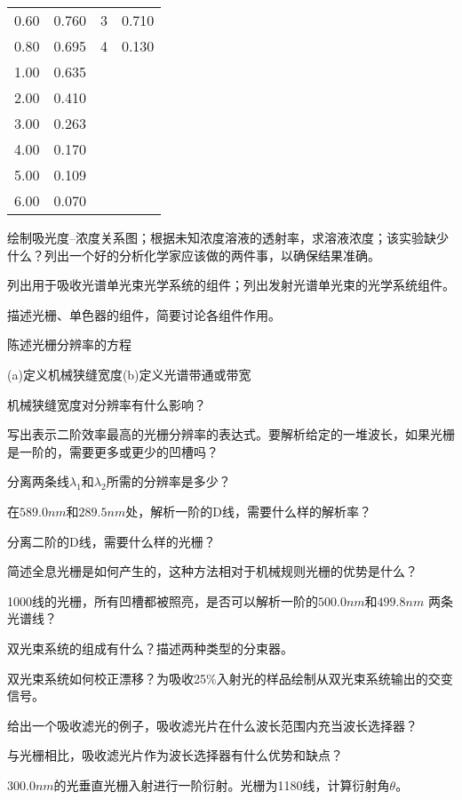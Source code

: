 \begin{problemset}
\begin{table}[htbp]
\begin{tabular}{lccc}
            0.60 & 0.760 & 3 & 0.710 \\
            0.80 & 0.695 & 4 & 0.130 \\
            1.00 & 0.635 &  &  \\
            2.00 & 0.410 &  &  \\
            3.00 & 0.263 &  &  \\
            4.00 & 0.170 &  &  \\
            5.00 & 0.109 &  &  \\
            6.00 & 0.070 &  &  \\
            \hline
        \end{tabular}
    \end{table}

    绘制吸光度--浓度关系图；根据未知浓度溶液的透射率，求溶液浓度；该实验缺少
    什么？列出一个好的分析化学家应该做的两件事，以确保结果准确。
\item 列出用于吸收光谱单光束光学系统的组件；列出发射光谱单光束的光学系统组件。
\item 描述光栅、单色器的组件，简要讨论各组件作用。
\item 陈述光栅分辨率的方程
\item (a)定义机械狭缝宽度(b)定义光谱带通或带宽
\item 机械狭缝宽度对分辨率有什么影响？
\item 写出表示二阶效率最高的光栅分辨率的表达式。要解析给定的一堆波长，如果光栅
    是一阶的，需要更多或更少的凹槽吗？
\item 分离两条线$\lambda_1$和$\lambda_2$所需的分辨率是多少？
\item 在$589.0 nm$和$289.5 nm$处，解析一阶的D线，需要什么样的解析率？
\item 分离二阶的D线，需要什么样的光栅？
\item 简述全息光栅是如何产生的，这种方法相对于机械规则光栅的优势是什么？
\item 1000线的光栅，所有凹槽都被照亮，是否可以解析一阶的$500.0 nm$和$499.8 nm$
    两条光谱线？
\item 双光束系统的组成有什么？描述两种类型的分束器。
\item 双光束系统如何校正漂移？为吸收25\%入射光的样品绘制从双光束系统输出的交变
    信号。
\item 给出一个吸收滤光的例子，吸收滤光片在什么波长范围内充当波长选择器？
\item 与光栅相比，吸收滤光片作为波长选择器有什么优势和缺点？
\item $300.0 nm$的光垂直光栅入射进行一阶衍射。光栅为1180线，计算衍射角$\theta$。

\end{problemset}
